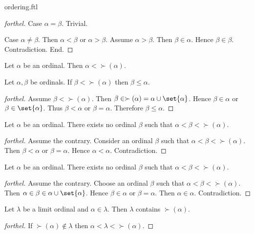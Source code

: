 \documentclass{naproche-library}
\begin{document}
\begin{smodule}[title=The Standard Ordering of the Ordinals]{ordering.ftl}
\begin{proof}[forthel]
  Case $\alpha = \beta$. Trivial.

  Case $\alpha \neq \beta$.
    Then $\alpha < \beta$ or $\alpha > \beta$.
    Assume $\alpha > \beta$.
    Then $\beta \in \alpha$.
    Hence $\beta \in \beta$.
    Contradiction.
  End.
\end{proof}

\begin{proposition}[forthel,id=SET_THEORY_02_5689190964527104]
  Let $\alpha$ be an ordinal.
  Then $\alpha < \succ(\alpha)$.
\end{proposition}

\begin{proposition}[forthel,id=SET_THEORY_02_4064972025888768]
  Let $\alpha, \beta$ be ordinals.
  If $\beta < \succ(\alpha)$ then $\beta \leq \alpha$.
\end{proposition}
\begin{proof}[forthel]
  Assume $\beta < \succ(\alpha)$.
  Then $\beta \in \succ(\alpha) = \alpha \cup \set{\alpha}$.
  Hence $\beta \in \alpha$ or $\beta \in \set{\alpha}$.
  Thus $\beta < \alpha$ or $\beta = \alpha$.
  Therefore $\beta \leq \alpha$.
\end{proof}

\begin{proposition}[forthel,id=SET_THEORY_02_8242798790705152]
  Let $\alpha$ be an ordinal.
  There exists no ordinal $\beta$ such that $\alpha < \beta < \succ(\alpha)$.
\end{proposition}
\begin{proof}[forthel]
  Assume the contrary.
  Consider an ordinal $\beta$ such that $\alpha < \beta < \succ(\alpha)$.
  Then $\beta < \alpha$ or $\beta = \alpha$.
  Hence $\alpha < \alpha$.
  Contradiction.
\end{proof}

\begin{proposition}[forthel,id=SET_THEORY_02_4240355610329088]
  Let $\alpha$ be an ordinal.
  There exists no ordinal $\beta$ such that $\alpha < \beta < \succ(\alpha)$.
\end{proposition}
\begin{proof}[forthel]
  Assume the contrary.
  Choose an ordinal $\beta$ such that $\alpha < \beta < \succ(\alpha)$.
  Then $\alpha \in \beta \in \alpha \cup \set{\alpha}$.
  Hence $\beta \in \alpha$ or $\beta = \alpha$.
  Then $\alpha \in \alpha$.
  Contradiction.
\end{proof}

\begin{proposition}[forthel,id=SET_THEORY_02_4659024620421120]
  Let $\lambda$ be a limit ordinal and $\alpha \in \lambda$.
  Then $\lambda$ contains $\succ(\alpha)$.
\end{proposition}
\begin{proof}[forthel]
  If $\succ(\alpha) \notin \lambda$ then $\alpha < \lambda < \succ(\alpha)$.
\end{proof}
\end{smodule}
\end{document}
